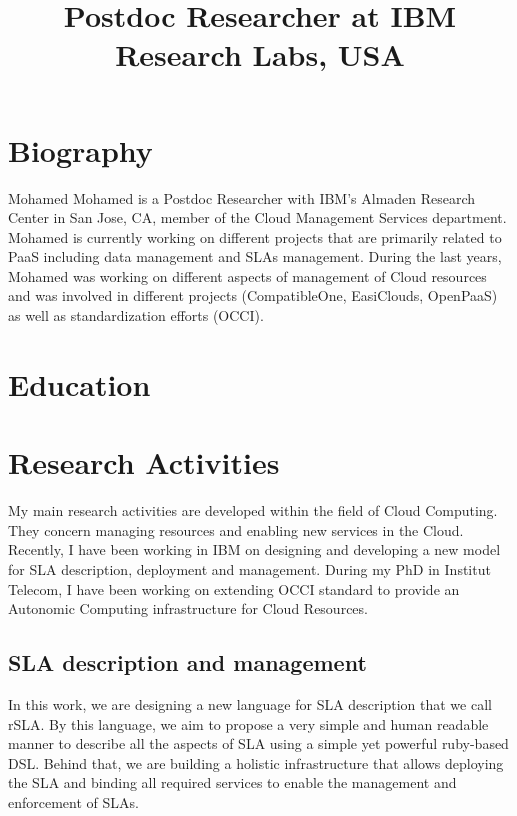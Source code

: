 \documentclass[11pt,a4paper,sans]{moderncv}   %
\title{Postdoc Researcher at IBM Research Labs, USA}               %
\begin{document}
\makecvtitle
\section{Biography} 
Mohamed Mohamed is a Postdoc Researcher with IBM's Almaden Research Center in San Jose, CA, member of the Cloud Management Services department. 
Mohamed is currently working on different projects that are primarily related to PaaS including data management and SLAs management. During 
the last years, Mohamed was working on different aspects of management of Cloud resources and was involved in different projects (CompatibleOne, 
EasiClouds, OpenPaaS) as well as standardization efforts (OCCI).

\section{Education}
\section{Research Activities}
My main research activities are developed within the field of Cloud Computing. They concern managing resources and enabling new services in the 
Cloud. Recently, I have been working in IBM on designing and developing a new model for SLA description, deployment and management. During my PhD in Institut Telecom, I have been 
working on extending OCCI standard to provide an Autonomic 
Computing infrastructure for Cloud Resources. 
\subsection{SLA description and management}
In this work, we are designing a new language for SLA description that we call rSLA. By this language, we aim to propose a very simple and human 
readable manner to describe all the aspects of SLA using a simple yet powerful ruby-based DSL. Behind that, we are building a holistic infrastructure 
that allows deploying the SLA and binding all required services to enable the management and enforcement of SLAs.
\end{document}
